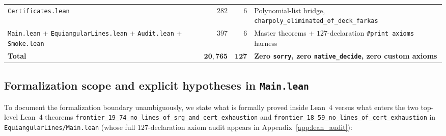 \documentclass[11pt,reqno]{amsart}
\theoremstyle{definition}
\theoremstyle{remark}
\numberwithin{equation}{section}
\numberwithin{table}{section}
\begin{document}
\begin{table}[htbp]
{\begin{tabular}{@{}lrrl@{}}
\nolinkurl{Certificates.lean} & $282$ & $6$ & Polynomial-list bridge, \nolinkurl{charpoly_eliminated_of_deck_farkas} \\
\nolinkurl{Main.lean} + \nolinkurl{EquiangularLines.lean} + \nolinkurl{Audit.lean} + \nolinkurl{Smoke.lean} & $397$ & $6$ & Master theorems + $127$-declaration \texttt{\#print axioms} harness \\
\midrule
\textbf{Total} & $\mathbf{20{,}765}$ & $\mathbf{127}$ & \textbf{Zero \texttt{sorry}, zero \texttt{native\_decide}, zero custom axioms} \\
\bottomrule
\end{tabular}%
}
\end{table}

\subsection{Formalization scope and explicit hypotheses in \texttt{Main.lean}}
To document the formalization boundary unambiguously, we state what is formally proved inside Lean~4 versus what enters the two top-level Lean~4 theorems \nolinkurl{frontier_19_74_no_lines_of_srg_and_cert_exhaustion} and \nolinkurl{frontier_18_59_no_lines_of_cert_exhaustion} in \nolinkurl{EquiangularLines/Main.lean} (whose full $127$-declaration axiom audit appears in Appendix~\ref{app:lean_audit}):
\end{document}
